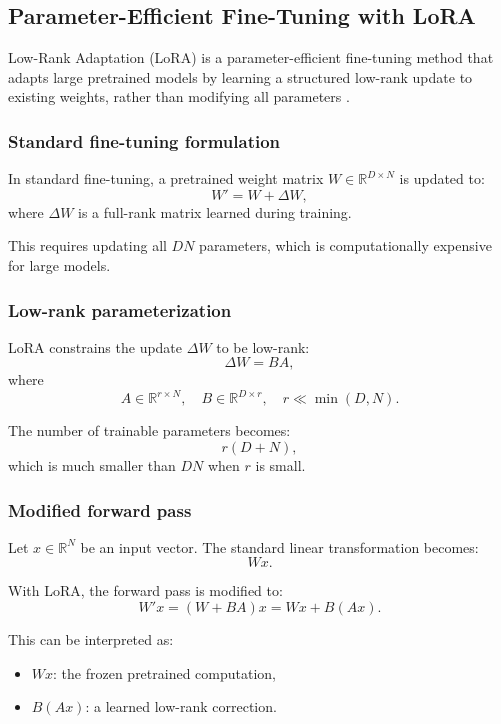 \documentclass{article}
\begin{document}
\subsection{Parameter-Efficient Fine-Tuning with LoRA}

Low-Rank Adaptation (LoRA) is a parameter-efficient fine-tuning method that adapts large pretrained models by learning a structured low-rank update to existing weights, rather than modifying all parameters \cite{hu2022lora}.

\subsubsection{Standard fine-tuning formulation}

In standard fine-tuning, a pretrained weight matrix $W \in \mathbb{R}^{D \times N}$ is updated to:
\[
W' = W + \Delta W,
\]
where $\Delta W$ is a full-rank matrix learned during training.

This requires updating all $DN$ parameters, which is computationally expensive for large models.

\subsubsection{Low-rank parameterization}

LoRA constrains the update $\Delta W$ to be low-rank:
\[
\Delta W = BA,
\]
where
\[
A \in \mathbb{R}^{r \times N}, \quad B \in \mathbb{R}^{D \times r}, \quad r \ll \min(D, N).
\]

The number of trainable parameters becomes:
\[
r(D + N),
\]
which is much smaller than $DN$ when $r$ is small.

\subsubsection{Modified forward pass}

Let $x \in \mathbb{R}^N$ be an input vector. The standard linear transformation becomes:
\[
Wx.
\]

With LoRA, the forward pass is modified to:
\[
W'x = (W + BA)x = Wx + B(Ax).
\]

This can be interpreted as:
\begin{itemize}
    \item $Wx$: the frozen pretrained computation,
    \item $B(Ax)$: a learned low-rank correction.
\end{itemize}
\end{document}
